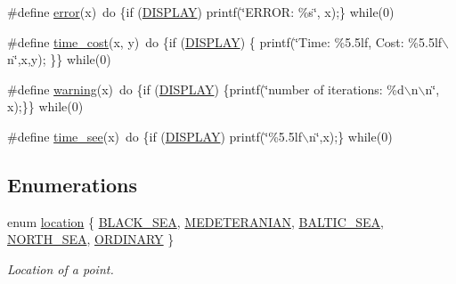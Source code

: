 \begin{DoxyCompactItemize}
\item 
\#define \hyperlink{a00016_a697acf769962bc23eb3413977c54c639_a697acf769962bc23eb3413977c54c639}{error}(x)~do \{if (\hyperlink{a00016_ab4bf926a45354a2f328f1a7b94ebd3c5_ab4bf926a45354a2f328f1a7b94ebd3c5}{\-D\-I\-S\-P\-L\-A\-Y}) printf(\char`\"{}\-E\-R\-R\-O\-R\-: \%s\char`\"{}, x);\} while(0)
\item 
\#define \hyperlink{a00016_a84f6fe04dcb629e501acaa6a238c9a02_a84f6fe04dcb629e501acaa6a238c9a02}{time\-\_\-cost}(x, y)~do \{if (\hyperlink{a00016_ab4bf926a45354a2f328f1a7b94ebd3c5_ab4bf926a45354a2f328f1a7b94ebd3c5}{\-D\-I\-S\-P\-L\-A\-Y}) \{ printf(\char`\"{}\-Time\-: \%5.\-5lf, Cost\-: \%5.\-5lf$\backslash$n\char`\"{},x,y); \}\} while(0)
\item 
\#define \hyperlink{a00016_adbf07a45e036d82a4c5071fdd8405458_adbf07a45e036d82a4c5071fdd8405458}{warning}(x)~do \{if (\hyperlink{a00016_ab4bf926a45354a2f328f1a7b94ebd3c5_ab4bf926a45354a2f328f1a7b94ebd3c5}{\-D\-I\-S\-P\-L\-A\-Y}) \{printf(\char`\"{}number of iterations\-: \%d$\backslash$n$\backslash$n\char`\"{}, x);\}\} while(0)
\item 
\#define \hyperlink{a00016_ad31b62fe2ef557aebcf2300a672d7e36_ad31b62fe2ef557aebcf2300a672d7e36}{time\-\_\-see}(x)~do \{if (\hyperlink{a00016_ab4bf926a45354a2f328f1a7b94ebd3c5_ab4bf926a45354a2f328f1a7b94ebd3c5}{\-D\-I\-S\-P\-L\-A\-Y}) printf(\char`\"{}\%5.\-5lf$\backslash$n\char`\"{},x);\} while(0)
\end{DoxyCompactItemize}
\subsection*{\-Enumerations}
\begin{DoxyCompactItemize}
\item 
enum \hyperlink{a00016_a5f269c22e6d9d32b0b0ad7e6166854df_a5f269c22e6d9d32b0b0ad7e6166854df}{location} \{ \*
\hyperlink{a00016_a5f269c22e6d9d32b0b0ad7e6166854df_a5f269c22e6d9d32b0b0ad7e6166854dfa235f8123c86ea3fc40e1b6cd1ed7c172}{\-B\-L\-A\-C\-K\-\_\-\-S\-E\-A}, 
\hyperlink{a00016_a5f269c22e6d9d32b0b0ad7e6166854df_a5f269c22e6d9d32b0b0ad7e6166854dfa9c3327b166a4167a933b7c8f1e15583b}{\-M\-E\-D\-E\-T\-E\-R\-A\-N\-I\-A\-N}, 
\hyperlink{a00016_a5f269c22e6d9d32b0b0ad7e6166854df_a5f269c22e6d9d32b0b0ad7e6166854dfa6dedb45f6c3ac5daec9bb907224206dc}{\-B\-A\-L\-T\-I\-C\-\_\-\-S\-E\-A}, 
\hyperlink{a00016_a5f269c22e6d9d32b0b0ad7e6166854df_a5f269c22e6d9d32b0b0ad7e6166854dfaad03d1c98aa862f00130d0d17a96b9e6}{\-N\-O\-R\-T\-H\-\_\-\-S\-E\-A}, 
\*
\hyperlink{a00016_a5f269c22e6d9d32b0b0ad7e6166854df_a5f269c22e6d9d32b0b0ad7e6166854dfa8124d17f836efbb680ba3311e78c8cba}{\-O\-R\-D\-I\-N\-A\-R\-Y}
 \}
\begin{DoxyCompactList}\small\item\em \-Location of a point. \end{DoxyCompactList}\end{DoxyCompactItemize}
